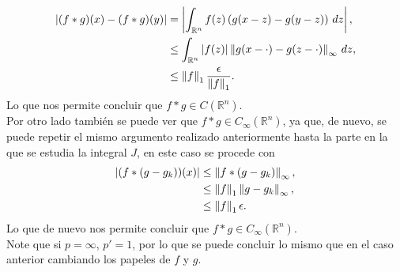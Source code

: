 \begin{homeworkProblem}
\begin{solution}
\begin{enumerate}[(i)]
        \begin{align*}
          |(f*g)(x)-(f*g)(y)|&=\left| \int_{\mathbb{R}^{n}}f(z)\left( g(x-z)-g(y-z) \right)\, dz \right|,\\
          &\leq \int_{\mathbb{R}^{n}}|f(z)|\left\|g(x-\cdot)-g(z-\cdot)\right\|_{\infty}\, dz,\\
          &\leq \left\|f\right\|_{1}\frac{\epsilon}{\left\|f\right\|_{1}}.
        \end{align*}
        Lo que nos permite concluir que $f*g\in C(\mathbb{R}^{n})$.\\
        Por otro lado también se puede ver que $f*g\in C_{\infty}(\mathbb{R}^{n})$, ya que, de nuevo, se puede repetir el mismo argumento realizado anteriormente hasta la parte en la que se estudia la integral $J$, en este caso se procede con
        \begin{align*}
          |(f*(g-g_k))(x)|&\leq\left\|f*(g-g_{k})\right\|_{\infty},\\
          &\leq \left\|f\right\|_{1}\left\|g-g_{k}\right\|_{\infty},\\
          &\leq \left\|f\right\|_{1}\epsilon.
        \end{align*}
        Lo que de nuevo nos permite concluir que $f*g\in C_{\infty}(\mathbb{R}^{n})$.\\
        Note que si $p=\infty$, $p'=1$, por lo que se puede concluir lo mismo que en el caso anterior cambiando los papeles de $f$ y $g$.
    \end{enumerate}   
  \end{solution}
\end{homeworkProblem}
